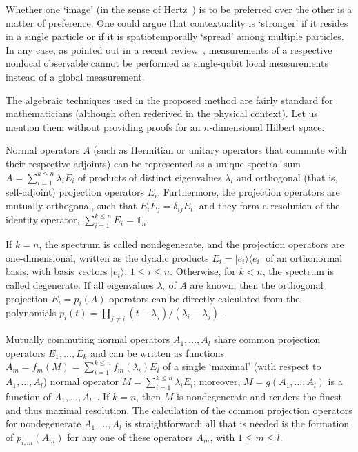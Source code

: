 \documentclass[
  twocolumn,
 showpacs,
 showkeys,
 preprintnumbers,
 amsmath,amssymb,
 aps,
 prl,
  longbibliography,
 floatfix,
 ]{revtex4-2}
\begin{document}
Whether one `image' (in the sense of Hertz~\cite{hertz-94e}) is to be preferred over the other is a matter of preference. One could argue that contextuality is `stronger' if it resides in a single particle or if it is spatiotemporally `spread' among multiple particles.
In any case, as pointed out in a recent review~\cite{cabello2021contextuality}, measurements of a respective nonlocal observable cannot be performed as single-qubit local measurements instead of a global measurement.

The algebraic techniques used in the proposed method are fairly standard for mathematicians (although often rederived in the physical context).
Let us mention them without providing proofs for an $n$-dimensional Hilbert space.

Normal operators $A$ (such as Hermitian or unitary operators that commute with their respective adjoints) can be represented as a unique spectral sum $A = \sum_{i=1}^{k \le n} \lambda_i E_i$ of products of distinct eigenvalues $\lambda_i$
and orthogonal (that is, self-adjoint) projection operators $E_i$.
Furthermore, the projection operators are mutually orthogonal, such that $E_i E_j = \delta_{ij} E_i$,
and they form a resolution of the identity operator, $\sum_{i=1}^{k \le n} E_i = \mathbb{1}_n$.

If $k = n$, the spectrum is called nondegenerate, and the projection operators are one-dimensional, written as the dyadic products $E_i = |e_i\rangle \langle e_i|$ of an orthonormal basis,  with basis vectors $|e_i\rangle$, $1 \le i \le n$.
Otherwise, for $k < n$, the spectrum is called degenerate.
If all eigenvalues $\lambda_i$ of $A$ are known, then the orthogonal projection $E_i = p_i(A)$ operators can be directly calculated from the polynomials
$p_i(t) = \prod_{j \neq i} (t - \lambda_j) / (\lambda_i - \lambda_j)$~\cite[Sec. 79]{halmos-vs}.


Mutually commuting normal operators $A_1, \ldots, A_l$ share common projection operators $E_1, \ldots, E_k$ and can be written as functions $A_m = f_m(M) = \sum_{i=1}^{k \le n} f_m(\lambda_i) E_i$
of a single `maximal' (with respect to $A_1, \ldots, A_l$) normal operator $M = \sum_{i=1}^{k \le n} \lambda_i E_i$; moreover, $M = g(A_1, \ldots, A_l)$ is a function of $A_1, \ldots, A_l$~\cite[Satz 8]{v-neumann-31}.
If $k = n$, then $M$ is nondegenerate and renders the finest and thus maximal resolution.
The calculation of the common projection operators for nondegenerate $A_1, \ldots, A_l$ is straightforward: all that is needed is the formation of $p_{i,m}(A_m)$ for any one of these operators $A_m$, with $1 \le m \le l$.
\end{document}
